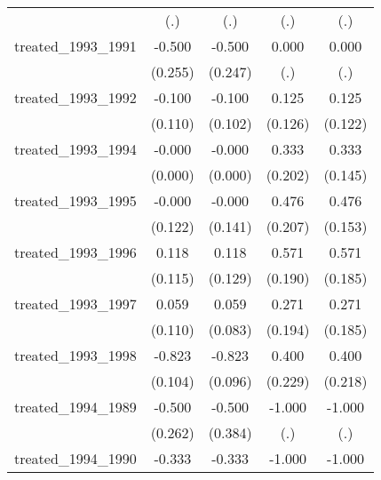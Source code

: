 {\begin{tabular}{l*{4}{c}}
            &         (.)         &         (.)         &         (.)         &         (.)         \\
[1em]
treated\_1993\_1991&      -0.500\sym{*}  &      -0.500\sym{*}  &       0.000         &       0.000         \\
            &     (0.255)         &     (0.247)         &         (.)         &         (.)         \\
[1em]
treated\_1993\_1992&      -0.100         &      -0.100         &       0.125         &       0.125         \\
            &     (0.110)         &     (0.102)         &     (0.126)         &     (0.122)         \\
[1em]
treated\_1993\_1994&      -0.000         &      -0.000         &       0.333         &       0.333\sym{*}  \\
            &     (0.000)         &     (0.000)         &     (0.202)         &     (0.145)         \\
[1em]
treated\_1993\_1995&      -0.000         &      -0.000         &       0.476\sym{*}  &       0.476\sym{**} \\
            &     (0.122)         &     (0.141)         &     (0.207)         &     (0.153)         \\
[1em]
treated\_1993\_1996&       0.118         &       0.118         &       0.571\sym{**} &       0.571\sym{**} \\
            &     (0.115)         &     (0.129)         &     (0.190)         &     (0.185)         \\
[1em]
treated\_1993\_1997&       0.059         &       0.059         &       0.271         &       0.271         \\
            &     (0.110)         &     (0.083)         &     (0.194)         &     (0.185)         \\
[1em]
treated\_1993\_1998&      -0.823\sym{***}&      -0.823\sym{***}&       0.400         &       0.400         \\
            &     (0.104)         &     (0.096)         &     (0.229)         &     (0.218)         \\
[1em]
treated\_1994\_1989&      -0.500         &      -0.500         &      -1.000         &      -1.000         \\
            &     (0.262)         &     (0.384)         &         (.)         &         (.)         \\
[1em]
treated\_1994\_1990&      -0.333         &      -0.333         &      -1.000         &      -1.000         \\

\end{tabular}}
